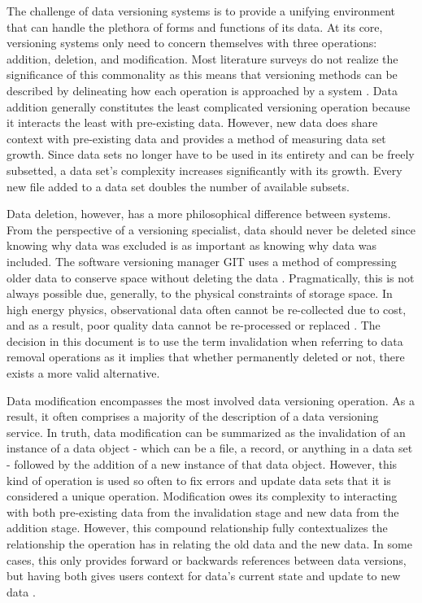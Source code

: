 The challenge of data versioning systems is to provide a unifying environment that can handle the plethora of forms and functions of its data.
At its core, versioning systems only need to concern themselves with three operations: addition, deletion, and modification.
Most literature surveys do not realize the significance of this commonality as this means that versioning methods can be described by delineating how each operation is approached by a system \cite{Tagger2005} \cite{burrows2006review}.
Data addition generally constitutes the least complicated versioning operation because it interacts the least with pre-existing data.
However, new data does share context with pre-existing data and provides a method of measuring data set growth.
Since data sets no longer have to be used in its entirety and can be freely subsetted, a data set's complexity increases significantly with its growth.
Every new file added to a data set doubles the number of available subsets.

Data deletion, however, has a more philosophical difference between systems.
From the perspective of a versioning specialist, data should never be deleted since knowing why data was excluded is as important as knowing why data was included.
The software versioning manager GIT uses a method of compressing older data to conserve space without deleting the data \cite{Chacon:2009:PG:1618548}.
Pragmatically, this is not always possible due, generally, to the physical constraints of storage space.
In high energy physics, observational data often cannot be re-collected due to cost, and as a result, poor quality data cannot be re-processed or replaced \cite{Cavanaugh2002}.
The decision in this document is to use the term invalidation when referring to data removal operations as it implies that whether permanently deleted or not, there exists a more valid alternative.

Data modification encompasses the most involved data versioning operation.
As a result, it often comprises a majority of the description of a data versioning service.
In truth, data modification can be summarized as the invalidation of an instance of a data object - which can be a file, a record, or anything in a data set - followed by the addition of a new instance of that data object.
However, this kind of operation is used so often to fix errors and update data sets that it is considered a unique operation.
Modification owes its complexity to interacting with both pre-existing data from the invalidation stage and new data from the addition stage.
However, this compound relationship fully contextualizes the relationship the operation has in relating the old data and the new data.
In some cases, this only provides forward or backwards references between data versions, but having both gives users context for data's current state and update to new data \cite{Klein01ontologyversioning}.

